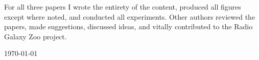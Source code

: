     For all three papers I wrote the entirety of the content, produced all figures except where noted, and conducted all experiments. Other authors reviewed the papers, made suggestions, discussed ideas, and vitally contributed to the Radio Galaxy Zoo project.

\vspace*{4cm}

\hspace{8cm}\makeatletter\@author\makeatother\par
\hspace{8cm}\today
